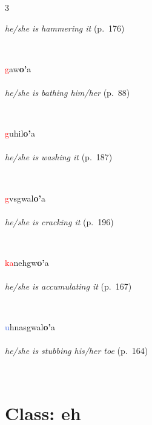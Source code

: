 \documentclass[oneside,openany]{book}%
\begin{document}
\begin{multicols}{3}
\begin{minipage}[t]{\linewidth}
\noindent \textit{he/she is hammering it} (p.~176)
\end{minipage}\\[1em]%
\begin{minipage}[t]{\linewidth}
\raggedright\noindent \textcolor{Red}{g}aw\textbf{o'}a\\
\\
\noindent \textit{he/she is bathing him/her} (p.~88)
\end{minipage}\\[1em]%
\begin{minipage}[t]{\linewidth}
\raggedright\noindent \textcolor{Red}{g}uhil\textbf{o'}a\\
\\
\noindent \textit{he/she is washing it} (p.~187)
\end{minipage}\\[1em]%
\begin{minipage}[t]{\linewidth}
\raggedright\noindent \textcolor{Red}{g}vsgwal\textbf{o'}a\\
\\
\noindent \textit{he/she is cracking it} (p.~196)
\end{minipage}\\[1em]%
\begin{minipage}[t]{\linewidth}
\raggedright\noindent \textcolor{Red}{ka}nehgw\textbf{o'}a\\
\\
\noindent \textit{he/she is accumulating it} (p.~167)
\end{minipage}\\[1em]%
\begin{minipage}[t]{\linewidth}
\raggedright\noindent \textcolor{RoyalBlue}{u}hnasgwal\textbf{o'}a\\
\\
\noindent \textit{he/she is stubbing his/her toe} (p.~164)
\end{minipage}\\[1em]%
\end{multicols}%
\vspace{1em}%
\needspace{3in}%
\section*{Class: eh}%
%
\needspace{1.5in}%
\end{document}
